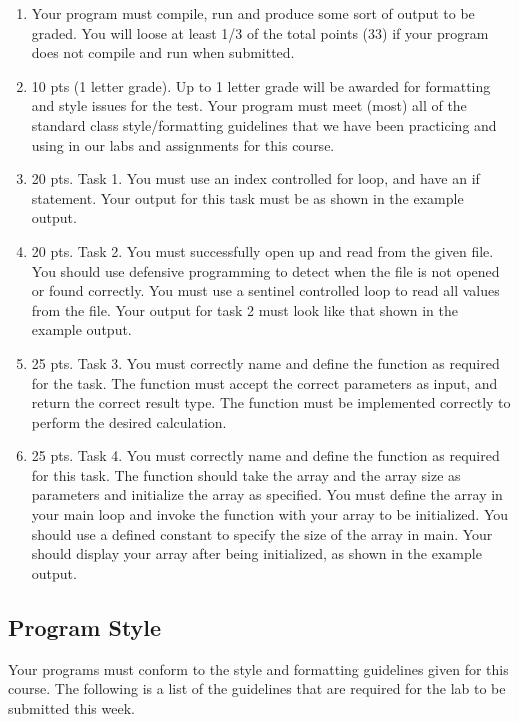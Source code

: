 \documentclass[11pt]{article}
\begin{document}
\begin{enumerate}
\item Your program must compile, run and produce some sort of output to
   be graded. You will loose at least 1/3 of the total points (33) if
   your program does not compile and run when submitted.
\item 10 pts (1 letter grade).  Up to 1 letter grade will be awarded for
   formatting and style issues for the test.  Your program must meet
   (most) all of the standard class style/formatting guidelines that
   we have been practicing and using in our labs and assignments for
   this course.
\item 20 pts. Task 1.  You must use an index controlled for loop, and
   have an if statement.  Your output for this task must be as
   shown in the example output.
\item 20 pts.  Task 2.  You must successfully open up and read from the
   given file.  You should use defensive programming to detect when
   the file is not opened or found correctly.  You must use a sentinel
   controlled loop to read all values from the file.  Your output
   for task 2 must look like that shown in the example output.
\item 25 pts. Task 3.  You must correctly name and define the function as
   required for the task.  The function must accept the correct
   parameters as input, and return the correct result type.  The
   function must be implemented correctly to perform the desired
   calculation.
\item 25 pts.  Task 4. You must correctly name and define the function as
   required for this task.  The function should take the array and the
   array size as parameters and initialize the array as specified.
   You must define the array in your main loop and invoke the function
   with your array to be initialized.  You should use a defined
   constant to specify the size of the array in main.  Your should
   display your array after being initialized, as shown in the example
   output.
\end{enumerate}
\subsection*{Program Style}
\label{sec-4-2}


Your programs must conform to the style and formatting guidelines given for this course.
The following is a list of the guidelines that are required for the lab to be submitted
this week.
\end{document}
